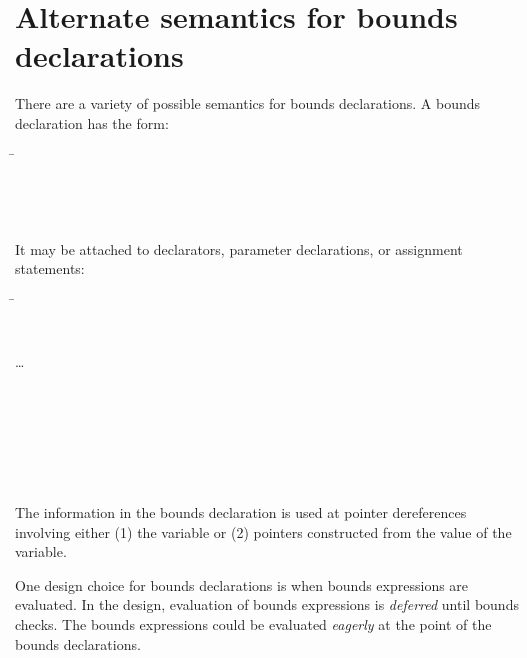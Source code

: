 \section{Alternate semantics for bounds declarations}
\label{section:bounds-declarations-alternate-semantics}

There are a variety of possible semantics for
bounds declarations. A bounds declaration has the form:

\begin{quote}
\end{quote}

\begin{tabbing}
\= \\
\> \code{)} \\
\>  \\
\> \boundsunknown \\
\> \boundsany
\end{tabbing}

It may be attached to declarators, parameter declarations, or assignment statements:

\begin{tabbing}
\= \\
\> \\
\> \code{=}  \\
\>\ldots{} \\
\\
 \\
\> \\
\> \\
\\
\\
\>\code{;}
\end{tabbing}

The information in the bounds declaration is used at pointer
dereferences involving either (1) the variable or (2) pointers
constructed from the value of the variable.

One design choice for bounds declarations is when
bounds expressions are evaluated.  In the design, evaluation of
bounds expressions is {\em deferred} until bounds checks.  The bounds
expressions could be evaluated {\em eagerly} at the point of the bounds declarations.

